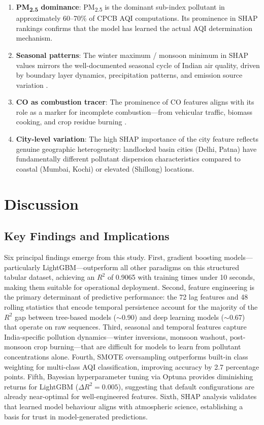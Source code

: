 \documentclass[conference]{IEEEtran}
\begin{document}
\begin{enumerate}
    \item \textbf{PM\textsubscript{2.5} dominance}: PM\textsubscript{2.5} is the dominant sub-index pollutant in approximately 60--70\% of CPCB AQI computations. Its prominence in SHAP rankings confirms that the model has learned the actual AQI determination mechanism.
    \item \textbf{Seasonal patterns}: The winter maximum / monsoon minimum in SHAP values mirrors the well-documented seasonal cycle of Indian air quality, driven by boundary layer dynamics, precipitation patterns, and emission source variation \cite{guttikunda2013}.
    \item \textbf{CO as combustion tracer}: The prominence of CO features aligns with its role as a marker for incomplete combustion---from vehicular traffic, biomass cooking, and crop residue burning \cite{ganguly2020}.
    \item \textbf{City-level variation}: The high SHAP importance of the city feature reflects genuine geographic heterogeneity: landlocked basin cities (Delhi, Patna) have fundamentally different pollutant dispersion characteristics compared to coastal (Mumbai, Kochi) or elevated (Shillong) locations.
\end{enumerate}

\section{Discussion}

\subsection{Key Findings and Implications}

Six principal findings emerge from this study. First, gradient boosting models---particularly LightGBM---outperform all other paradigms on this structured tabular dataset, achieving an $R^2$ of 0.9065 with training times under 10 seconds, making them suitable for operational deployment. Second, feature engineering is the primary determinant of predictive performance: the 72 lag features and 48 rolling statistics that encode temporal persistence account for the majority of the $R^2$ gap between tree-based models ($\sim$0.90) and deep learning models ($\sim$0.67) that operate on raw sequences. Third, seasonal and temporal features capture India-specific pollution dynamics---winter inversions, monsoon washout, post-monsoon crop burning---that are difficult for models to learn from pollutant concentrations alone. Fourth, SMOTE oversampling outperforms built-in class weighting for multi-class AQI classification, improving accuracy by 2.7 percentage points. Fifth, Bayesian hyperparameter tuning via Optuna provides diminishing returns for LightGBM ($\Delta R^2 = 0.005$), suggesting that default configurations are already near-optimal for well-engineered features. Sixth, SHAP analysis validates that learned model behaviour aligns with atmospheric science, establishing a basis for trust in model-generated predictions.
\end{document}
